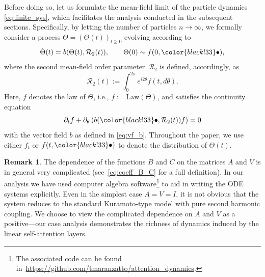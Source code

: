 \documentclass[10pt]{article}
\theoremstyle{definition}
\theoremstyle{definition}
\newtheorem{remark}[theorem]{Remark}
\numberwithin{equation}{section}
\newcommand{\CR}{\mathcal{R}}
\newcommand{\Law}{\mathrm{Law}}
\newcommand{\dummy}{\mathord{\color{black!33}\bullet}}
\newcommand{\thetaMF}{\Theta}
\begin{document}
Before doing so, let us formulate the mean-field limit of the particle dynamics \eqref{eq:finite_sys}, which facilitates the analysis conducted in the subsequent sections.
Specifically, by letting the number of particles $n \rightarrow \infty$, we formally consider a process $\Theta = (\Theta(t))_{t \geq 0}$ evolving according to
\begin{equation}\label{eq:mf_sys}
    \Dot{\thetaMF}(t)
    = b(\thetaMF(t), \CR_2(t)), \qquad \Theta(0) \sim f(0, \dummy),
\end{equation}
where the second mean-field order parameter~$\CR_2$ is defined, accordingly, as
\begin{equation}
    \label{eq:mf_order_param}
    \CR_2(t)
    := \int_0^{2\pi} e^{i2\theta} f(t, d\theta) .
\end{equation}
Here, $f$ denotes the law of $\thetaMF$, i.e., $f := \Law (\thetaMF)$, and satisfies the continuity equation
\begin{equation}\label{eq:cont_eq}
    \partial_t f + \partial_{\theta} \left( b(\dummy, \CR_2(t)) f \right) = 0
\end{equation}
with the vector field $b$ as defined in \eqref{eq:vf_b}. Throughout the paper, we use either $f_t$ or $f(t, \dummy)$ to denote the distribution of $\Theta(t)$.

\begin{remark}
The dependence of the functions $B$ and $C$ on the matrices $A$ and $V$ is in general very complicated (see~\eqref{eq:coeff_B_C} for a full definition).  
In our analysis we have used computer algebra software\footnote{The associated code can be found in~\url{https://github.com/tmaranzatto/attention_dynamics}.} to aid in writing the ODE systems explicitly. 
Even in the simplest case $A = V = I$, it is not obvious that the system reduces to the standard Kuramoto-type model with pure second harmonic coupling. We choose to view the complicated dependence on $A$ and $V$ as a positive---our case analysis demonstrates the richness of dynamics induced by the linear self-attention layers.
\end{remark}
\end{document}
